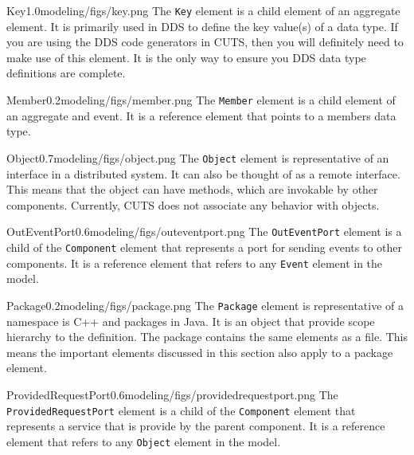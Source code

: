 \begin{modelelement}{Key}{1.0}{modeling/figs/key.png}
The \texttt{Key} element is a child element of an aggregate element. 
It is
primarily used in DDS to define the key value(s) of a data
type. If you are using the DDS code generators in CUTS, then
you will definitely need to make use of this element. It
is the only way to ensure you DDS data type definitions
are complete.
\end{modelelement}

\begin{modelelement}{Member}{0.2}{modeling/figs/member.png}
The \texttt{Member} element is a child element of an aggregate 
and event. It
is a reference element that points to a members data type.
\end{modelelement}

\begin{modelelement}{Object}{0.7}{modeling/figs/object.png}
The \texttt{Object} element is representative of an interface
in a distributed system. It can also be thought of as
a remote interface. This means that the object can have
methods, which are invokable by other components. Currently,
CUTS does not associate any behavior with objects. 
\end{modelelement}

\begin{modelelement}{OutEventPort}{0.6}{modeling/figs/outeventport.png}
The \texttt{OutEventPort} element is a child of the \texttt{Component}
element that represents a port for sending events to other components.
It is a reference element that refers to any \texttt{Event} element in
the model.
\end{modelelement}

\clearpage

\begin{modelelement}{Package}{0.2}{modeling/figs/package.png}
The \texttt{Package} element is representative of a 
namespace is C++ and packages in Java. It is an object
that provide scope hierarchy to the definition. The 
package contains the same elements as a file. This 
means the important elements discussed in this section
also apply to a package element. 
\end{modelelement}

\begin{modelelement}{ProvidedRequestPort}{0.6}{modeling/figs/providedrequestport.png}
The \texttt{ProvidedRequestPort} element is a child of the \texttt{Component}
element that represents a service that is provide by the parent component.
It is a reference element that refers to any \texttt{Object} element in
the model.
\end{modelelement}

